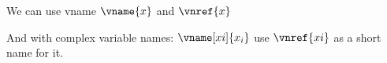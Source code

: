 \documentclass[minimal]{omdoc}
\begin{document}
We can use vname $\vname{x}$ and $\vnref{x}$

And with complex variable names: $\vname[xi]{x_i}$ use $\vnref{xi}$ as a short name for
it.
\end{document}
